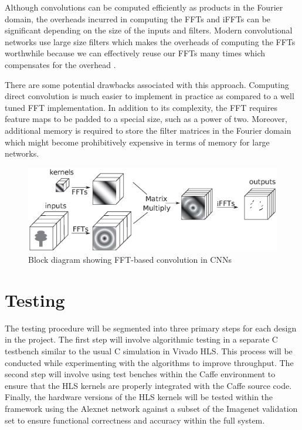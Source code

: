 \documentclass[conference,compsoc]{IEEEtran/IEEEtran}
\begin{document}
Although convolutions can be computed efficiently as products in the Fourier domain, the overheads incurred in computing the FFTs and iFFTs can be significant depending on the size of the inputs and filters. Modern convolutional networks use large size filters which makes the overheads of computing the FFTs worthwhile because we can effectively reuse our FFTs many times which compensates for the overhead \cite{FFT1}.

There are some potential drawbacks associated with this approach. Computing direct convolution is much easier to implement in practice as compared to a well tuned FFT implementation. In addition to its complexity, the FFT requires feature maps to be padded to a special size, such as a power of two. Moreover, additional memory is required to store the filter matrices in the Fourier domain which might become prohibitively expensive in terms of memory for large networks.

\begin{figure}[!h]
\begin{center}
\centering
\includegraphics[width=1\columnwidth]{CNN-FFT.eps}
\caption{Block diagram showing FFT-based convolution in CNNs}
\label{CNN-FFT}
\end{center}
\end{figure}

\section{Testing}\label{section:testing}
The testing procedure will be segmented into three primary steps for each design in the project.
The first step will involve algorithmic testing in a separate C testbench similar to the usual C
simulation in Vivado HLS. This process will be conducted while experimenting with the algorithms
to improve throughput. The second step will involve using test benches within the Caffe environment
to ensure that the HLS kernels are properly integrated with the Caffe source code. Finally, the
hardware versions of the HLS kernels will be tested within the framework using the Alexnet network
against a subset of the Imagenet validation set to ensure functional correctness and accuracy
within the full system.
\end{document}
